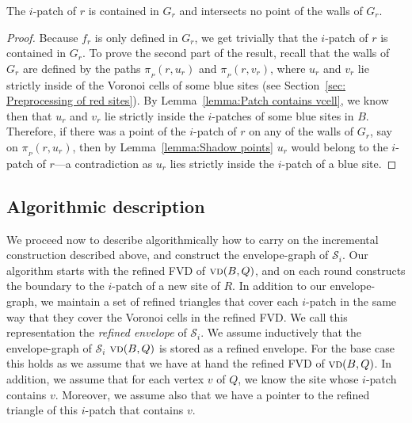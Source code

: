\documentclass[a4paper,UKenglish]{socg-lipics-v2018}
\newcommand{\icell}[1][i]{${#1}$-patch\xspace}
\newcommand{\icells}[1][i]{${#1}$-patches\xspace}
\newcommand{\s}{\mathcal S}
\newcommand{\p}[3][P]{\ensuremath{\pi_{_{#1}}(#2, #3)}}
\newcommand{\vd}[2][P]{\textsc{vd}(#2, #1)}
\begin{document}
\begin{lemma}\label{lemma: Patch in G_r}
The \icell of $r$ is contained in $G_r$ and intersects no point of the walls of $G_r$.
\end{lemma}
\begin{proof}
Because $f_r$ is only defined in $G_r$, we get trivially that the \icell of $r$ is contained in $G_r$. To prove the second part of the result,
recall that the walls of $G_r$ are defined by the paths $\p{r}{u_r}$ and $\p{r}{v_r}$, where $u_r$ and $v_r$ lie strictly inside of the Voronoi cells of some blue sites (see Section~\ref{sec: Preprocessing of red sites}).
By Lemma~\ref{lemma:Patch contains vcell}, we know then that $u_r$ and $v_r$ lie strictly inside the \icells of some blue sites in $B$.
Therefore, if there was a point of the \icell of $r$ on any of the walls of $G_r$, say on $\p{r}{u_r}$, then by Lemma~\ref{lemma:Shadow points} $u_r$ would belong to the \icell of $r$---a contradiction as $u_r$ lies strictly inside the \icell of a blue site. 
\end{proof}




\subsection{Algorithmic description} 

We proceed now to describe algorithmically how to carry on the incremental construction described above, and construct the envelope-graph of $\s_i$.
Our algorithm starts with the refined FVD of $\vd[Q]{B}$, and on each round constructs the boundary to the \icell of a new site of $R$. 
In addition to our envelope-graph, we maintain a set of refined triangles that cover each \icell in the same way that they cover the Voronoi cells in the refined FVD.
We call this representation the \emph{refined envelope} of $\s_i$.
We assume inductively that the envelope-graph of $\s_i$ $\vd[Q]{B}$ is stored as a refined envelope. 
For the base case this holds as we assume that we have at hand the refined FVD of $\vd[Q]{B}$.
In addition, we assume that for each vertex $v$ of $Q$, we know the site whose \icell contains $v$. 
Moreover, we assume also that we have a pointer to the refined triangle of this \icell that contains $v$.
\end{document}
